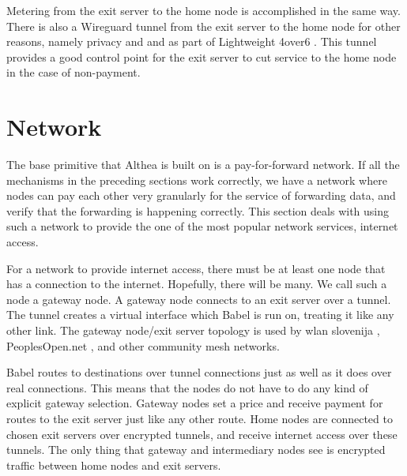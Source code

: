 \documentclass[11pt]{article}
\begin{document}
Metering from the exit server to the home node is accomplished in the same way. There is also a Wireguard tunnel from the exit server to the home node for other reasons, namely privacy and and as part of Lightweight 4over6 \cite{4over6}. This tunnel provides a good control point for the exit server to cut service to the home node in the case of non-payment. 

\section{Network}
\label{sec:network}
The base primitive that Althea is built on is a pay-for-forward network. If all the mechanisms in the preceding sections work correctly, we have a network where nodes can pay each other very granularly for the service of forwarding data, and verify that the forwarding is happening correctly. This section deals with using such a network to provide the one of the most popular network services, internet access.

\begin{figure}[h]
\end{figure}

For a network to provide internet access, there must be at least one node that has a connection to the internet. Hopefully, there will be many. We call such a node a gateway node. A gateway node connects to an exit server over a tunnel. The tunnel creates a virtual interface which Babel is run on, treating it like any other link. The gateway node/exit server topology \cite{exittopology} is used by wlan slovenija \cite{wlanslovenija}, PeoplesOpen.net \cite{pplsopen}, and other community mesh networks.

Babel routes to destinations over tunnel connections just as well as it does over real connections. This means that the nodes do not have to do any kind of explicit gateway selection. Gateway nodes set a price and receive payment for routes to the exit server just like any other route. Home nodes are connected to chosen exit servers over encrypted tunnels, and receive internet access over these tunnels. The only thing that gateway and intermediary nodes see is encrypted traffic between home nodes and exit servers.
\end{document}

